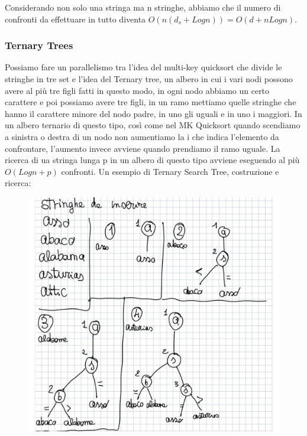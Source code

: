 \documentclass[14pt]{extreport}
\begin{document}
Considerando non solo una stringa ma n stringhe, abbiamo che il numero di confronti da effettuare in tutto diventa $O(n(d_s + Logn)) = O(d+nLogn)$.

\subsubsection{Ternary Trees}

Possiamo fare un parallelismo tra l'idea del multi-key quicksort che divide le stringhe in tre set e l'idea del Ternary tree, un albero in cui i vari nodi possono avere al più tre figli fatti in questo modo, in ogni nodo abbiamo un certo carattere e poi possiamo avere tre figli, in un ramo mettiamo quelle stringhe che hanno il carattere minore del nodo padre, in uno gli uguali e in uno i maggiori.
In un albero ternario di questo tipo, così come nel MK Quicksort quando scendiamo a sinistra o destra di un nodo non aumentiamo la i che indica l'elemento da confrontare, l'aumento invece avviene quando prendiamo il ramo uguale.
La ricerca di ua stringa lunga p in un albero di questo tipo avviene eseguendo al più $O(Logn + p)$ confronti.
Un esempio di Ternary Search Tree, costruzione e ricerca:

\begin{figure}[]
\centering
  \includegraphics[width=0.85\linewidth]{Es1Trie.jpg}
\end{figure}
\end{document}
